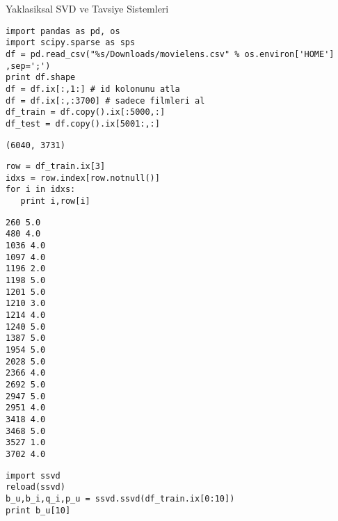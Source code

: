 \documentclass[12pt,fleqn]{article}\usepackage{../common}
\begin{document}
Yaklasiksal SVD ve Tavsiye Sistemleri

\begin{verbatim}
import pandas as pd, os
import scipy.sparse as sps
df = pd.read_csv("%s/Downloads/movielens.csv" % os.environ['HOME'] ,sep=';')
print df.shape
df = df.ix[:,1:] # id kolonunu atla
df = df.ix[:,:3700] # sadece filmleri al
df_train = df.copy().ix[:5000,:]
df_test = df.copy().ix[5001:,:]
\end{verbatim}

\begin{verbatim}
(6040, 3731)
\end{verbatim}


\begin{verbatim}
row = df_train.ix[3]
idxs = row.index[row.notnull()]
for i in idxs:
   print i,row[i]
\end{verbatim}

\begin{verbatim}
260 5.0
480 4.0
1036 4.0
1097 4.0
1196 2.0
1198 5.0
1201 5.0
1210 3.0
1214 4.0
1240 5.0
1387 5.0
1954 5.0
2028 5.0
2366 4.0
2692 5.0
2947 5.0
2951 4.0
3418 4.0
3468 5.0
3527 1.0
3702 4.0
\end{verbatim}










\begin{verbatim}
import ssvd
reload(ssvd)
b_u,b_i,q_i,p_u = ssvd.ssvd(df_train.ix[0:10])
print b_u[10]
\end{verbatim}
\end{document}
